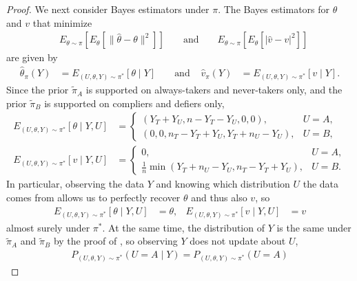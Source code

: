 \documentclass[12pt,reqno]{amsart}
\begin{document}
\begin{proof}
    We next consider Bayes estimators under $\pi$.
    The Bayes estimators for $\theta$ and $v$ that minimize
    \begin{align*} 
        &E_{\theta \sim \pi}[ E_\theta [\| \hat{\theta} - \theta \|^2]]
        &
        &\text{ and }
        &
        &E_{\theta \sim \pi}[ E_\theta [| \hat{v} - v |^2 ]]
    \end{align*}
    are given by
    \begin{align*}
        \hat{\theta}_\pi(Y) &= E_{(U,\theta,Y) \sim \pi^*}[\theta \mid Y]
        &
        &\text{ and }
        &
        \hat{v}_\pi(Y) &= E_{(U,\theta,Y) \sim \pi^*}[v \mid Y].
    \end{align*}
    Since the prior $\tilde{\pi}_A$ is supported on always-takers and never-takers only, and the prior $\tilde{\pi}_B$ is supported on compliers and defiers only, 
    \begin{align*}
        E_{(U,\theta,Y) \sim \pi^*}[\theta \mid Y, U]
        &=
        \begin{cases}
            (Y_T + Y_U, n - Y_T - Y_U, 0, 0)
            , & U = A, \\
            (0,0,n_T - Y_T + Y_U, Y_T + n_U - Y_U)
            , & U = B,
        \end{cases}
        \\
        E_{(U,\theta,Y) \sim \pi^*}[v \mid Y, U]
        &=
        \begin{cases}
           0
            , & U = A, \\
            \tfrac{1}{n} \min(Y_T + n_U - Y_U, n_T - Y_T + Y_U)
            , & U = B.
        \end{cases}
    \end{align*}
    In particular,
    observing the data $Y$ and
    knowing which distribution $U$ the data comes from allows us to perfectly recover $\theta$ and thus also $v$,
    so
    \begin{align}
    \label{eqn:conditional-target}
        E_{(U,\theta,Y) \sim \pi^*}[\theta \mid Y, U]
        &= \theta,
        &
        E_{(U,\theta,Y) \sim \pi^*}[v \mid Y, U]
        &= v
    \end{align}
    almost surely under $\pi^*$.
    At the same time,
    the distribution of $Y$ is the same under $\tilde{\pi}_A$ and $\tilde{\pi}_B$ by the proof of , so observing $Y$ does not update about $U$,
    \begin{align*}
        P_{(U,\theta,Y) \sim \pi^*}(U = A \mid Y)
        = P_{(U,\theta,Y) \sim \pi^*}(U = A)

\end{align*}
\end{proof}
\end{document}
